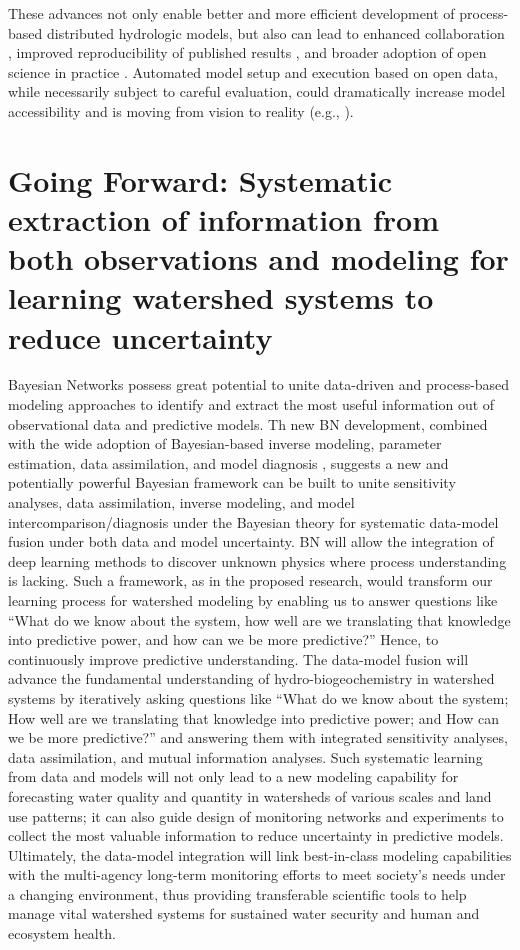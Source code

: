 \documentclass[preprint,review, 12pt]{elsarticle}
\begin{document}
These advances not only enable better and more efficient development of process-based distributed hydrologic models, but also can lead to enhanced collaboration \citep{Bandaragoda2019}, improved reproducibility of published results \citep{Stagge2019}, and broader adoption of open science in practice \citep{Yu2016}. Automated model setup and execution based on open data, while necessarily subject to careful evaluation, could dramatically increase model accessibility and is moving from vision to reality (e.g., \cite{Starn2018, Lewis2018}).


\section{Going Forward: Systematic extraction of information from both observations and modeling for learning watershed systems to reduce uncertainty}

Bayesian Networks possess great potential to unite data-driven and process-based modeling approaches to identify and extract the most useful information out of observational data and predictive models. Th new BN development, combined with the wide adoption of Bayesian-based inverse modeling, parameter estimation, data assimilation, and model diagnosis \citep{Rubin2010b, Chen2013a, Chen2012a, Nearing2018c, Liu2007b, Gupta2008, Over, Simmons2016, Ye2004, Joseph2013, Gelman2014c, Nearing2016}, suggests a new and potentially powerful Bayesian framework can be built to unite sensitivity analyses, data assimilation, inverse modeling, and model intercomparison/diagnosis under the Bayesian theory for systematic data-model fusion under both data and model uncertainty. BN will allow the integration of deep learning methods \citep{Sun2019, Sun2018, Shenc, Gentine2018, Reichstein2019} to discover unknown physics where process understanding is lacking. Such a framework, as in the proposed research, would transform our learning process for watershed modeling by enabling us to answer questions like “What do we know about the system, how well are we translating that knowledge into predictive power, and how can we be more predictive?” Hence, to continuously improve predictive understanding. The data-model fusion will advance the fundamental understanding of hydro-biogeochemistry in watershed systems by iteratively asking questions like “What do we know about the system; How well are we translating that knowledge into predictive power; and How can we be more predictive?” and answering them with integrated sensitivity analyses, data assimilation, and mutual information analyses. Such systematic learning from data and models will not only lead to a new modeling capability for forecasting water quality and quantity in watersheds of various scales and land use patterns; it can also guide design of monitoring networks and experiments to collect the most valuable information to reduce uncertainty in predictive models. Ultimately, the data-model integration will link best-in-class modeling capabilities with the multi-agency long-term monitoring efforts to meet society’s needs under a changing environment, thus providing transferable scientific tools to help manage vital watershed systems for sustained water security and human and ecosystem health.
\end{document}
